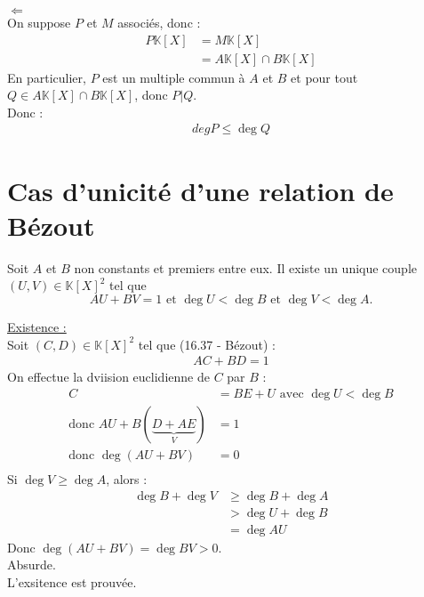 \documentclass[../main.tex]{subfiles}
\begin{document}
$\boxed{\Leftarrow}$ \\
On suppose $P$ et $M$ associés, donc : 
\begin{align*}
    P \mathbb{K}[X] &= M \mathbb{K}[X] \\
    &= A \mathbb{K}[X] \cap B \mathbb{K}[X]
\end{align*}
En particulier, $P$ est un multiple commun à $A$ et $B$ et pour tout $Q \in A \mathbb{K}[X] \cap B \mathbb{K}[X]$, donc $P|Q$. \\
Donc : 
\begin{align*}
    \boxed{deg P \leq \deg Q}
\end{align*}

\section{Cas d'unicité d'une relation de Bézout}
\begin{tcolorbox}[title=Propostion 16.42, title filled=false, colframe=lightblue, colback=lightblue!10!white]
    Soit $A$ et $B$ non constants et premiers entre eux. Il existe un unique couple $(U, V) \in \mathbb{K}[X]^2$ tel que
    $$AU + BV = 1 \text{ et } \deg U < \deg B \text{ et } \deg V < \deg A.$$
\end{tcolorbox}

\noindent \underline{Existence :} \\
Soit $(C, D) \in \mathbb{K}[X]^2$ tel que (16.37 - Bézout) :
\begin{align*}
    AC + BD = 1
\end{align*}
On effectue la dviision euclidienne de $C$ par $B$ :
\begin{align*}
    C &= BE + U \text{ avec } \deg U < \deg B \\
    \text{donc } AU + B(\underbrace{D + AE}_{V}) &= 1 \\
    \text{donc } \deg (AU + BV) &= 0 \\
\end{align*}
Si $\deg V \geq \deg A$, alors :
\begin{align*}
    \deg B + \deg V &\geq \deg B + \deg A \\
    &> \deg U + \deg B \\
    &= \deg AU
\end{align*}
Donc $\deg (AU + BV) = \deg BV > 0$. \\
Absurde. \\
L'exsitence est prouvée. \\ \\
\end{document}
